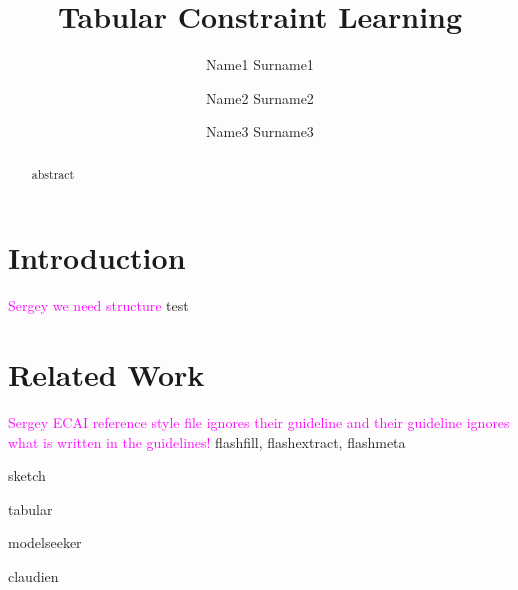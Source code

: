 \documentclass{ecai}
\newcommand{\sergey}[1]{\textcolor{magenta}{{\sc Sergey} #1}\xspace}
\begin{document}
\title{Tabular Constraint Learning}

\author{Name1 Surname1 \and Name2 Surname2 \and Name3 Surname3  }

\maketitle

\begin{abstract}
  abstract
  \end{abstract}
\section{Introduction}
\sergey{we need structure} test

\section{Related Work}
\sergey{ECAI reference style file ignores their guideline and their guideline ignores what is written in the guidelines!}
flashfill, flashextract, flashmeta \cite{flashfill,flashextract,flashmeta}

sketch \cite{sketch}

tabular \cite{tabular}

modelseeker \cite{modelseeker}

claudien \cite{claudien}



\end{document}
